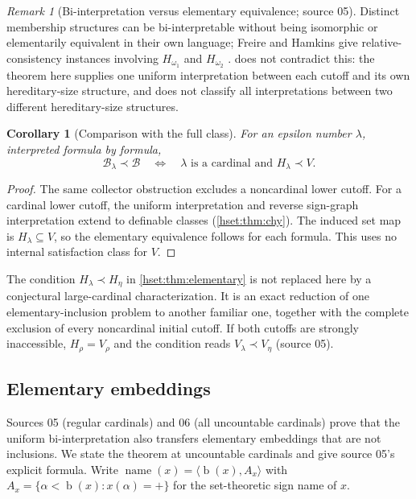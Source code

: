 \documentclass[11pt,letterpaper]{article}
\newtheorem{corollary}[corollary]{Corollary}\aliascntresetthe{corollary}
\theoremstyle{definition}
\theoremstyle{remark}
\newtheorem{remark}[remark]{Remark}\aliascntresetthe{remark}
\newcommand{\bd}{\operatorname{b}}
\newcommand{\B}{\mathcal B}
\newcommand{\name}{\operatorname{name}}
\begin{document}
\begin{remark}[Bi-interpretation versus elementary equivalence; source 05]
Distinct membership structures can be bi-interpretable without being
isomorphic or elementarily equivalent in their own language; Freire and Hamkins
give relative-consistency instances involving $H_{\omega_1}$ and $H_{\omega_2}$
\cite{FreireHamkins}.  does not contradict this: the
theorem here supplies one uniform interpretation between each cutoff and its
own hereditary-size structure, and does not classify all interpretations
between two different hereditary-size structures.
\end{remark}

\begin{corollary}[Comparison with the full class]
\label{hset:cor:fullclass}
For an epsilon number $\lambda$, interpreted formula by formula,
\[
 \B_\lambda\prec\B
 \quad\Longleftrightarrow\quad
 \lambda\text{ is a cardinal and }H_\lambda\prec V.
\]
\end{corollary}
\begin{proof}
The same collector obstruction excludes a noncardinal lower cutoff. For a
cardinal lower cutoff, the uniform interpretation and reverse sign-graph
interpretation extend to definable classes (\cref{hset:thm:chy}). The induced
set map is $H_\lambda\subseteq V$, so the elementary equivalence follows for each
formula. This uses no internal satisfaction class for $V$.
\end{proof}

The condition $H_\lambda\prec H_\eta$ in \cref{hset:thm:elementary} is not
replaced here by a conjectural large-cardinal characterization. It is an exact
reduction of one elementary-inclusion problem to another familiar one,
together with the complete exclusion of every noncardinal initial cutoff. If
both cutoffs are strongly inaccessible, $H_\rho=V_\rho$ and the condition reads
$V_\lambda\prec V_\eta$ (source 05).

\subsection{Elementary embeddings}
\label{hset:sub:embeddings}

Sources 05 (regular cardinals) and 06 (all uncountable cardinals) prove that the
uniform bi-interpretation also transfers elementary embeddings that are not
inclusions. We state the theorem at uncountable cardinals and give source 05's
explicit formula. Write $\name(x)=\langle\bd(x),A_x\rangle$ with
$A_x=\{\alpha<\bd(x):x(\alpha)=+\}$ for the set-theoretic sign name of $x$.
\end{document}
